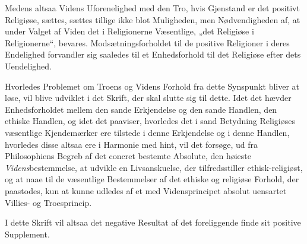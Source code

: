 \documentclass[12pt,a4paper]{book}
\begin{document}
Medens altsaa Videns Uforenelighed med den Tro, hvis Gjenstand er det positivt Religiøse,
sættes, sættes tillige ikke blot Muligheden, men Nødvendigheden af, at under Valget af Viden det
i Religionerne Væsentlige, „det Religiøse i Religionerne“, bevares. Modsætningsforholdet til de
positive Religioner i deres Endelighed forvandler sig saaledes til et Enhedsforhold til det
Religiøse efter dets Uendelighed.

Hvorledes Problemet om Troens og Videns Forhold fra dette Synspunkt bliver at løse, vil blive
udviklet i det Skrift, der skal slutte sig til dette. Idet det hævder Enhedsforholdet mellem den
sande Erkjendelse og den sande Handlen, den ethiske Handlen, og idet det paaviser, hvorledes det
i sand Betydning Religiøses væsentlige Kjendemærker ere tilstede i denne Erkjendelse og i denne
Handlen, hvorledes disse altsaa ere i Harmonie med hint, vil det forsøge, ud fra Philosophiens
Begreb af det concret bestemte Absolute, den høieste \emph{Videns}bestemmelse, at udvikle en
Livsanskuelse, der tilfredsstiller ethisk-religiøst, og at naae til de væsentlige Bestemmelser
af det ethiske og religiøse Forhold, der paastodes, kun at kunne udledes af et med
Vidensprincipet absolut uensartet Villies- og Troesprincip.

I dette Skrift vil altsaa det
negative Resultat af det foreliggende finde sit positive Supplement.
\end{document}
